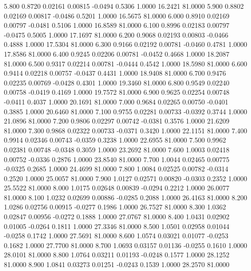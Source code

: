    5.800   0.8720   0.02161   0.00815  -0.0494   0.5306   1.0000  16.2421  81.0000
   5.900   0.8802   0.02169   0.00817  -0.0486   0.5201   1.0000  16.5675  81.0000
   6.000   0.8910   0.02169   0.00797  -0.0481   0.5106   1.0000  16.8589  81.0000
   6.100   0.8996   0.02183   0.00797  -0.0475   0.5005   1.0000  17.1697  81.0000
   6.200   0.9068   0.02193   0.00803  -0.0466   0.4888   1.0000  17.5304  81.0000
   6.300   0.9166   0.02192   0.00781  -0.0460   0.4781   1.0000  17.8586  81.0000
   6.400   0.9245   0.02206   0.00781  -0.0452   0.4668   1.0000  18.2087  81.0000
   6.500   0.9317   0.02214   0.00781  -0.0444   0.4542   1.0000  18.5980  81.0000
   6.600   0.9414   0.02218   0.00757  -0.0437   0.4431   1.0000  18.9408  81.0000
   6.700   0.9476   0.02235   0.00769  -0.0428   0.4301   1.0000  19.3460  81.0000
   6.800   0.9549   0.02240   0.00758  -0.0419   0.4169   1.0000  19.7572  81.0000
   6.900   0.9625   0.02254   0.00748  -0.0411   0.4037   1.0000  20.1691  81.0000
   7.000   0.9684   0.02265   0.00750  -0.0401   0.3885   1.0000  20.6460  81.0000
   7.100   0.9755   0.02281   0.00733  -0.0392   0.3744   1.0000  21.0896  81.0000
   7.200   0.9806   0.02297   0.00742  -0.0381   0.3576   1.0000  21.6209  81.0000
   7.300   0.9868   0.02322   0.00733  -0.0371   0.3420   1.0000  22.1151  81.0000
   7.400   0.9914   0.02346   0.00743  -0.0359   0.3238   1.0000  22.6955  81.0000
   7.500   0.9962   0.02381   0.00748  -0.0348   0.3059   1.0000  23.2692  81.0000
   7.600   1.0003   0.02418   0.00752  -0.0336   0.2876   1.0000  23.8540  81.0000
   7.700   1.0044   0.02465   0.00775  -0.0325   0.2685   1.0000  24.4699  81.0000
   7.800   1.0084   0.02525   0.00782  -0.0314   0.2520   1.0000  25.0057  81.0000
   7.900   1.0127   0.02571   0.00820  -0.0303   0.2352   1.0000  25.5522  81.0000
   8.000   1.0175   0.02648   0.00839  -0.0294   0.2212   1.0000  26.0077  81.0000
   8.100   1.0232   0.02699   0.00886  -0.0285   0.2088   1.0000  26.4163  81.0000
   8.200   1.0286   0.02756   0.00915  -0.0277   0.1986   1.0000  26.7527  81.0000
   8.300   1.0362   0.02847   0.00956  -0.0272   0.1888   1.0000  27.0767  81.0000
   8.400   1.0431   0.02902   0.01005  -0.0264   0.1811   1.0000  27.3346  81.0000
   8.500   1.0501   0.02958   0.01044  -0.0258   0.1742   1.0000  27.5691  81.0000
   8.600   1.0574   0.03021   0.01077  -0.0253   0.1682   1.0000  27.7700  81.0000
   8.700   1.0693   0.03157   0.01136  -0.0255   0.1610   1.0000  28.0101  81.0000
   8.800   1.0764   0.03211   0.01193  -0.0248   0.1577   1.0000  28.1252  81.0000
   8.900   1.0841   0.03273   0.01251  -0.0243   0.1539   1.0000  28.2570  81.0000
